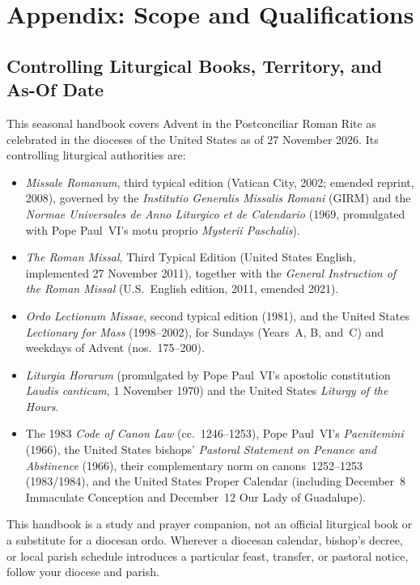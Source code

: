 \section{Appendix: Scope and Qualifications}\label{app:scope}

\subsection{Controlling Liturgical Books, Territory, and As-Of Date}

This seasonal handbook covers Advent in the Postconciliar Roman Rite as celebrated in the dioceses of the United States as of 27 November 2026. Its controlling liturgical authorities are:

\begin{itemize}
  \item \textit{Missale Romanum}, third typical edition (Vatican City, 2002; emended reprint, 2008), governed by the \textit{Institutio Generalis Missalis Romani} (GIRM) and the \textit{Normae Universales de Anno Liturgico et de Calendario} (1969, promulgated with Pope Paul~VI's motu proprio \textit{Mysterii Paschalis}).
  \item \textit{The Roman Missal}, Third Typical Edition (United States English, implemented 27 November 2011), together with the \textit{General Instruction of the Roman Missal} (U.S.~English edition, 2011, emended 2021).
  \item \textit{Ordo Lectionum Missae}, second typical edition (1981), and the United States \textit{Lectionary for Mass} (1998--2002), for Sundays (Years~A, B, and~C) and weekdays of Advent (nos.~175--200).
  \item \textit{Liturgia Horarum} (promulgated by Pope Paul~VI's apostolic constitution \textit{Laudis canticum}, 1 November 1970) and the United States \textit{Liturgy of the Hours}.
  \item The 1983 \textit{Code of Canon Law} (cc.~1246--1253), Pope Paul~VI's \textit{Paenitemini} (1966), the United States bishops' \textit{Pastoral Statement on Penance and Abstinence} (1966), their complementary norm on canons~1252--1253 (1983/1984), and the United States Proper Calendar (including December~8 Immaculate Conception and December~12 Our Lady of Guadalupe).
\end{itemize}

This handbook is a study and prayer companion, not an official liturgical book or a substitute for a diocesan ordo. Wherever a diocesan calendar, bishop's decree, or local parish schedule introduces a particular feast, transfer, or pastoral notice, follow your diocese and parish.


